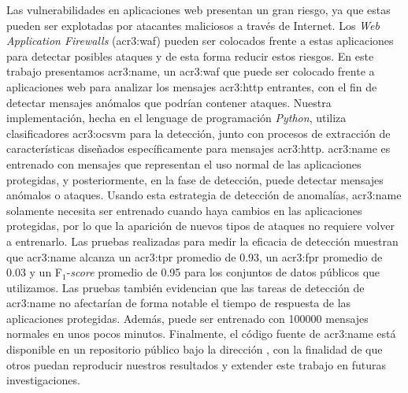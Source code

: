 \begin{resumen}
    Las vulnerabilidades en aplicaciones web presentan un gran riesgo, ya
    que estas pueden ser explotadas por atacantes maliciosos a través
    de Internet. Los \textit{Web Application Firewalls} (\gls{acr3:waf})
    pueden ser colocados frente a estas aplicaciones para detectar
    posibles ataques y de esta forma reducir estos riesgos.
    En este trabajo presentamos \gls{acr3:name}, un \gls{acr3:waf} que
    puede ser colocado frente a aplicaciones web para analizar los mensajes
    \gls{acr3:http} entrantes, con el fin de detectar mensajes anómalos
    que podrían contener ataques.
    Nuestra implementación, hecha en el lenguage de programación
    \textit{Python}, utiliza clasificadores \gls{acr3:ocsvm} para la
    detección, junto con procesos de extracción de características
    diseñados específicamente para mensajes \gls{acr3:http}.
    \gls{acr3:name} es entrenado con mensajes que representan el uso
    normal de las aplicaciones protegidas, y posteriormente, en la fase
    de detección, puede detectar mensajes anómalos o ataques.
    Usando esta estrategia de detección de anomalías, \gls{acr3:name}
    solamente necesita ser entrenado cuando haya cambios en las
    aplicaciones protegidas, por lo que la aparición de nuevos tipos de
    ataques no requiere volver a entrenarlo.
    Las pruebas realizadas para medir la eficacia de detección muestran
    que \gls{acr3:name} alcanza un \gls{acr3:tpr} promedio de \num{0.93},
    un \gls{acr3:fpr} promedio de \num{0.03} y un F$_{1}$-\textit{score}
    promedio de \num{0.95} para los conjuntos de datos públicos que
    utilizamos.
    Las pruebas también evidencian que las tareas de detección de \gls{acr3:name}
    no afectarían de forma notable el tiempo de respuesta de las aplicaciones
    protegidas. Además, puede ser entrenado con \num{100000} mensajes
    normales en unos pocos minutos.
    Finalmente, el código fuente de \gls{acr3:name} está disponible en
    un repositorio público bajo la dirección \TheRepoUrl, con la finalidad
    de que otros puedan reproducir nuestros resultados y extender este
    trabajo en futuras investigaciones.

\end{resumen}
